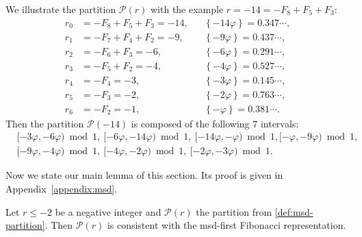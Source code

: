 \documentclass[12pt,runningheads]{llncs}
\newcommand{\cP}{\mathcal{P}}
\renewcommand{\phi}{\varphi}
\newcommand{\fract}[1]{\left\{ #1 \right\}}
\begin{document}
\begin{example}
   We illustrate the partition $\cP(r)$ with the example $r = -14 = -F_8 + F_5 + F_3$:
\begin{align*}
    r_0 &= -F_8 + F_5 + F_3 = -14,  && \fract{-14\phi}=0.347 \cdots, \\
    r_1 &= -F_7 + F_4 + F_2 = - 9, && \fract{-9\phi}=0.437 \cdots,\\
    r_2 &= -F_6 + F_3 = - 6, && \fract{-6\phi}=0.291 \cdots, \\
    r_3 &= -F_5 + F_2 = - 4, && \fract{-4\phi}=0.527 \cdots, \\
    r_4 &= -F_4 = - 3, && \fract{-3\phi}=0.145 \cdots, \\
    r_5 &= -F_3 = - 2, && \fract{-2\phi}=0.763 \cdots, \\
    r_6 &= -F_2 = - 1, && \fract{-\phi}=0.381 \cdots.
\end{align*} 
Then the partition $\cP(-14)$ is composed of the  following $7$ intervals:
\begin{align*}
&[-3\phi,-6\phi) \bmod 1,\ [-6\phi,-14\phi)\bmod 1,\ [-14\phi,-\phi)\bmod 1, 
[-\phi,-9\phi)\bmod 1, \\ 
&[-9\phi,-4\phi)\bmod 1,\
[-4\phi,-2\phi)\bmod 1,\ [-2\phi,-3\phi)\bmod 1.
\end{align*}
\end{example}

Now we state our main lemma of this section. Its proof is given in Appendix~\ref{appendix:msd}. 
\begin{lemma}\label{lem:ingrid}
    Let $r\leq -2$ be a negative integer and $\cP(r)$ the partition from \cref{def:msd-partition}.
    Then $\cP(r)$ is consistent with the msd-first Fibonacci representation. 
\end{lemma}
\end{document}
